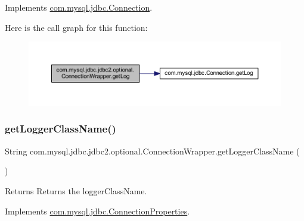 Implements \mbox{\hyperlink{interfacecom_1_1mysql_1_1jdbc_1_1_connection_a1cca3272f995742c608a1646e1433704}{com.\+mysql.\+jdbc.\+Connection}}.

Here is the call graph for this function\+:
\nopagebreak
\begin{figure}[H]
\begin{center}
\leavevmode
\includegraphics[width=350pt]{classcom_1_1mysql_1_1jdbc_1_1jdbc2_1_1optional_1_1_connection_wrapper_ab6845a61a447081e344ae983d1f424da_cgraph}
\end{center}
\end{figure}
\mbox{\label{classcom_1_1mysql_1_1jdbc_1_1jdbc2_1_1optional_1_1_connection_wrapper_a58f18c319fbdf5a591c9e602472e35da}} 
\subsubsection{\texorpdfstring{get\+Logger\+Class\+Name()}{getLoggerClassName()}}
{\footnotesize\ttfamily String com.\+mysql.\+jdbc.\+jdbc2.\+optional.\+Connection\+Wrapper.\+get\+Logger\+Class\+Name (\begin{DoxyParamCaption}{ }\end{DoxyParamCaption})}

\begin{DoxyReturn}{Returns}
Returns the logger\+Class\+Name. 
\end{DoxyReturn}


Implements \mbox{\hyperlink{interfacecom_1_1mysql_1_1jdbc_1_1_connection_properties_aab196f0a4527adf8f56c13b2530fbd23}{com.\+mysql.\+jdbc.\+Connection\+Properties}}.

